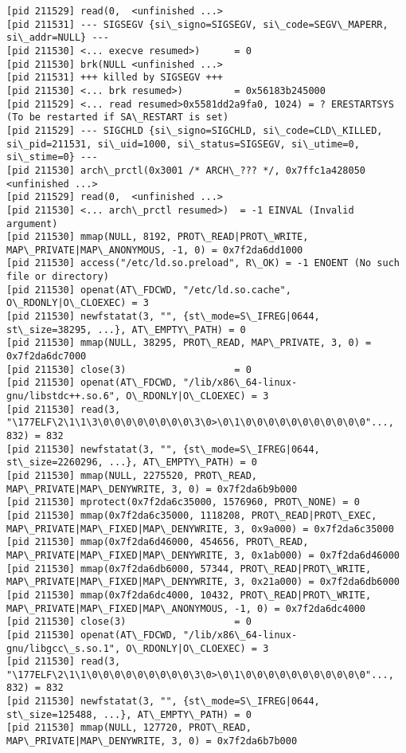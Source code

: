 \documentclass[a4paper, 12pt]{article}
\begin{document}
\begin{lstlisting}
[pid 211529] read(0,  <unfinished ...>
[pid 211531] --- SIGSEGV {si\_signo=SIGSEGV, si\_code=SEGV\_MAPERR, si\_addr=NULL} ---
[pid 211530] <... execve resumed>)      = 0
[pid 211530] brk(NULL <unfinished ...>
[pid 211531] +++ killed by SIGSEGV +++
[pid 211530] <... brk resumed>)         = 0x56183b245000
[pid 211529] <... read resumed>0x5581dd2a9fa0, 1024) = ? ERESTARTSYS (To be restarted if SA\_RESTART is set)
[pid 211529] --- SIGCHLD {si\_signo=SIGCHLD, si\_code=CLD\_KILLED, si\_pid=211531, si\_uid=1000, si\_status=SIGSEGV, si\_utime=0, si\_stime=0} ---
[pid 211530] arch\_prctl(0x3001 /* ARCH\_??? */, 0x7ffc1a428050 <unfinished ...>
[pid 211529] read(0,  <unfinished ...>
[pid 211530] <... arch\_prctl resumed>)  = -1 EINVAL (Invalid argument)
[pid 211530] mmap(NULL, 8192, PROT\_READ|PROT\_WRITE, MAP\_PRIVATE|MAP\_ANONYMOUS, -1, 0) = 0x7f2da6dd1000
[pid 211530] access("/etc/ld.so.preload", R\_OK) = -1 ENOENT (No such file or directory)
[pid 211530] openat(AT\_FDCWD, "/etc/ld.so.cache", O\_RDONLY|O\_CLOEXEC) = 3
[pid 211530] newfstatat(3, "", {st\_mode=S\_IFREG|0644, st\_size=38295, ...}, AT\_EMPTY\_PATH) = 0
[pid 211530] mmap(NULL, 38295, PROT\_READ, MAP\_PRIVATE, 3, 0) = 0x7f2da6dc7000
[pid 211530] close(3)                   = 0
[pid 211530] openat(AT\_FDCWD, "/lib/x86\_64-linux-gnu/libstdc++.so.6", O\_RDONLY|O\_CLOEXEC) = 3
[pid 211530] read(3, "\177ELF\2\1\1\3\0\0\0\0\0\0\0\0\3\0>\0\1\0\0\0\0\0\0\0\0\0\0\0"..., 832) = 832
[pid 211530] newfstatat(3, "", {st\_mode=S\_IFREG|0644, st\_size=2260296, ...}, AT\_EMPTY\_PATH) = 0
[pid 211530] mmap(NULL, 2275520, PROT\_READ, MAP\_PRIVATE|MAP\_DENYWRITE, 3, 0) = 0x7f2da6b9b000
[pid 211530] mprotect(0x7f2da6c35000, 1576960, PROT\_NONE) = 0
[pid 211530] mmap(0x7f2da6c35000, 1118208, PROT\_READ|PROT\_EXEC, MAP\_PRIVATE|MAP\_FIXED|MAP\_DENYWRITE, 3, 0x9a000) = 0x7f2da6c35000
[pid 211530] mmap(0x7f2da6d46000, 454656, PROT\_READ, MAP\_PRIVATE|MAP\_FIXED|MAP\_DENYWRITE, 3, 0x1ab000) = 0x7f2da6d46000
[pid 211530] mmap(0x7f2da6db6000, 57344, PROT\_READ|PROT\_WRITE, MAP\_PRIVATE|MAP\_FIXED|MAP\_DENYWRITE, 3, 0x21a000) = 0x7f2da6db6000
[pid 211530] mmap(0x7f2da6dc4000, 10432, PROT\_READ|PROT\_WRITE, MAP\_PRIVATE|MAP\_FIXED|MAP\_ANONYMOUS, -1, 0) = 0x7f2da6dc4000
[pid 211530] close(3)                   = 0
[pid 211530] openat(AT\_FDCWD, "/lib/x86\_64-linux-gnu/libgcc\_s.so.1", O\_RDONLY|O\_CLOEXEC) = 3
[pid 211530] read(3, "\177ELF\2\1\1\0\0\0\0\0\0\0\0\0\3\0>\0\1\0\0\0\0\0\0\0\0\0\0\0"..., 832) = 832
[pid 211530] newfstatat(3, "", {st\_mode=S\_IFREG|0644, st\_size=125488, ...}, AT\_EMPTY\_PATH) = 0
[pid 211530] mmap(NULL, 127720, PROT\_READ, MAP\_PRIVATE|MAP\_DENYWRITE, 3, 0) = 0x7f2da6b7b000

\end{lstlisting}
\end{document}
